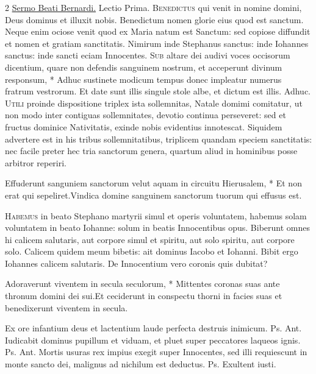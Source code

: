 \begin{multicols*}{2}
\newline \ul{Sermo Beati Bernardi.} {\color{Red} Lectio Prima.}
\lettrine[lines=2]{\zallmancaps \color{Red} B}{enedictus} qui venit in nomine domini, Deus dominus et illuxit nobis. Benedictum nomen glorie eius quod est sanctum. Neque enim ociose venit quod ex Maria natum est Sanctum: sed copiose diffundit et nomen et gratiam sanctitatis. Nimirum inde Stephanus sanctus: inde Iohannes sanctus: inde sancti eciam Innocentes. \R
\lettrine[lines=2]{\zallmancaps \color{Blue} S}{ub} \hypertarget{sub-altare-dei}{\label{sub-altare-dei}} altare dei audivi voces occisorum dicentium, quare non defendis sanguinem nostrum, et acceperunt divinum responsum, * Adhuc sustinete modicum tempus donec impleatur numerus fratrum vestrorum. \V Et date sunt illis singule stole albe, et dictum est illis. Adhuc.
\lettrine[lines=2]{\zallmancaps \color{Red} U}{tili} proinde dispositione triplex ista sollemnitas, Natale domimi comitatur, ut non modo inter contiguas sollemnitates, devotio continua perseveret: sed et fructus dominice Nativitatis, exinde nobis evidentius innotescat. Siquidem advertere est in his tribus sollemnitatibus, triplicem quandam speciem sanctitatis: nec facile preter hec tria sanctorum genera, quartum aliud in hominibus posse arbitror reperiri.
\begin{responsory}
{Effuderunt sanguniem sanctorum velut aquam in circuitu Hierusalem, * Et non erat qui sepeliret.}{Vindica domine sanguinem sanctorum tuorum qui effusus est.}
\end{responsory}%
\lettrine[lines=2]{\zallmancaps \color{Red} H}{abemus} in beato Stephano martyrii simul et operis voluntatem, habemus solam voluntatem in beato Iohanne: solum in beatis Innocentibus opus. Biberunt omnes hi calicem salutaris, aut corpore simul et spiritu, aut solo spiritu, aut corpore solo. Calicem quidem meum bibetis: ait dominus Iacobo et Iohanni. Bibit ergo Iohannes calicem salutaris. De Innocentium vero coronis quis dubitat?
\begin{responsory-doxology}
{Adoraverunt viventem in secula seculorum, * Mittentes coronas suas ante thronum domini dei sui.}{Et ceciderunt in conspectu thorni in facies suas et benedixerunt viventem in secula.}
\end{responsory-doxology}%
 Ex ore infantium deus et lactentium laude perfecta destruis inimicum. {\color{Red} Ps.}  {\color{Red} Ant.} Iudicabit dominus pupillum et viduam, et pluet super peccatores laqueos ignis. {\color{Red} Ps.}  {\color{Red} Ant.} Mortis usuras rex impius exegit super Innocentes, sed illi requiescunt in monte sancto dei, malignus ad nichilum est deductus. {\color{Red} Ps.}  \V Exultent iusti.

\end{multicols*}
